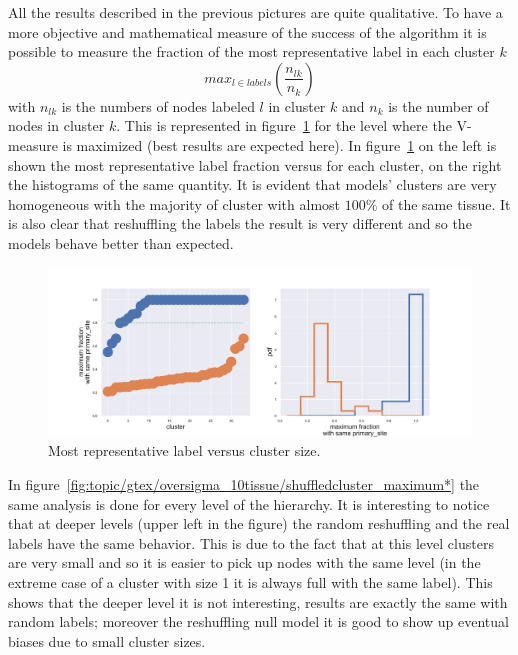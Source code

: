 All the results described in the previous pictures are quite qualitative. To have a more objective and mathematical measure of the success of the algorithm it is possible to measure the fraction of the most representative label in each cluster $k$
\[
max_{l\in labels}\left(\frac{n_{l k}}{n_k}\right)
\]
with $n_{l k}$ is the numbers of nodes labeled $l$ in cluster $k$ and $n_k$ is the number of nodes in cluster $k$. This is represented in figure~\ref{fig:gtex/oversigma_10tissue/shuffledcluster_maximum_l2_primary_site} for the level where the V-measure is maximized (best results are expected here). In figure~\ref{fig:gtex/oversigma_10tissue/shuffledcluster_maximum_l2_primary_site} on the left is shown the most representative label fraction versus for each cluster, on the right the histograms of the same quantity. It is evident that models' clusters are very homogeneous with the majority of cluster with almost $100\%$ of the same tissue. It is also clear that reshuffling the labels the result is very different and so the models behave better than expected. 
\begin{figure}[htb!]
    \centering
    \includegraphics[width=0.9\linewidth]{pictures/topic/gtex/oversigma_10tissue/shuffledcluster_maximum_l2_primary_site.pdf}
    \caption{Most representative label versus cluster size.}
    \label{fig:gtex/oversigma_10tissue/shuffledcluster_maximum_l2_primary_site}
\end{figure}
In figure~\ref{fig:topic/gtex/oversigma_10tissue/shuffledcluster_maximum*} the same analysis is done for every level of the hierarchy. It is interesting to notice that at deeper levels (upper left in the figure) the random reshuffling and the real labels have the same behavior. This is due to the fact that at this level clusters are very small and so it is easier to pick up nodes with the same level (in the extreme case of a cluster with size 1 it is always full with the same label). This shows that the deeper level it is not interesting, results are exactly the same with random labels;  moreover the reshuffling null model it is good to show up eventual biases due to small cluster sizes.
